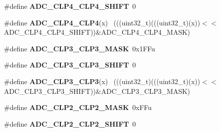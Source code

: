 \begin{DoxyCompactItemize}
\item 
\hypertarget{group___a_d_c___register___masks_gaee16600c1dd7fefead073d24320818a4}{}\#define {\bfseries A\+D\+C\+\_\+\+C\+L\+P4\+\_\+\+C\+L\+P4\+\_\+\+S\+H\+I\+F\+T}~0\label{group___a_d_c___register___masks_gaee16600c1dd7fefead073d24320818a4}

\item 
\hypertarget{group___a_d_c___register___masks_gaef5329e23db1d575dba2a4178dcb5625}{}\#define {\bfseries A\+D\+C\+\_\+\+C\+L\+P4\+\_\+\+C\+L\+P4}(x)                                              ~(((uint32\+\_\+t)(((uint32\+\_\+t)(x))$<$$<$A\+D\+C\+\_\+\+C\+L\+P4\+\_\+\+C\+L\+P4\+\_\+\+S\+H\+I\+F\+T))\&A\+D\+C\+\_\+\+C\+L\+P4\+\_\+\+C\+L\+P4\+\_\+\+M\+A\+S\+K)\label{group___a_d_c___register___masks_gaef5329e23db1d575dba2a4178dcb5625}

\item 
\hypertarget{group___a_d_c___register___masks_gaeae73e0daf3e9a9174024850a719768d}{}\#define {\bfseries A\+D\+C\+\_\+\+C\+L\+P3\+\_\+\+C\+L\+P3\+\_\+\+M\+A\+S\+K}~0x1\+F\+Fu\label{group___a_d_c___register___masks_gaeae73e0daf3e9a9174024850a719768d}

\item 
\hypertarget{group___a_d_c___register___masks_ga9eef257b72d4181481aa5e3bf0a85732}{}\#define {\bfseries A\+D\+C\+\_\+\+C\+L\+P3\+\_\+\+C\+L\+P3\+\_\+\+S\+H\+I\+F\+T}~0\label{group___a_d_c___register___masks_ga9eef257b72d4181481aa5e3bf0a85732}

\item 
\hypertarget{group___a_d_c___register___masks_ga73644af55f7d12673bbb70d8fc743a9d}{}\#define {\bfseries A\+D\+C\+\_\+\+C\+L\+P3\+\_\+\+C\+L\+P3}(x)                                              ~(((uint32\+\_\+t)(((uint32\+\_\+t)(x))$<$$<$A\+D\+C\+\_\+\+C\+L\+P3\+\_\+\+C\+L\+P3\+\_\+\+S\+H\+I\+F\+T))\&A\+D\+C\+\_\+\+C\+L\+P3\+\_\+\+C\+L\+P3\+\_\+\+M\+A\+S\+K)\label{group___a_d_c___register___masks_ga73644af55f7d12673bbb70d8fc743a9d}

\item 
\hypertarget{group___a_d_c___register___masks_ga2d10a369ac0c13f4ee3535e9f45a5d17}{}\#define {\bfseries A\+D\+C\+\_\+\+C\+L\+P2\+\_\+\+C\+L\+P2\+\_\+\+M\+A\+S\+K}~0x\+F\+Fu\label{group___a_d_c___register___masks_ga2d10a369ac0c13f4ee3535e9f45a5d17}

\item 
\hypertarget{group___a_d_c___register___masks_ga071963a7a6ff4f1b72c79c66aee09043}{}\#define {\bfseries A\+D\+C\+\_\+\+C\+L\+P2\+\_\+\+C\+L\+P2\+\_\+\+S\+H\+I\+F\+T}~0\label{group___a_d_c___register___masks_ga071963a7a6ff4f1b72c79c66aee09043}


\end{DoxyCompactItemize}
